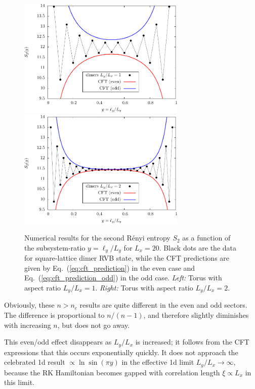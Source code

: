 \documentclass[11pt]{iopart}
\begin{document}
\begin{figure}[t]
\begin{center}
 \includegraphics[width=8cm]{./figures/dimers_shape.pdf}
 \includegraphics[width=8cm]{./figures/dimers_shape2.pdf}
 \end{center}
 \caption{Numerical results for the second R\'enyi entropy $S_2$ as a function of the subsystem-ratio $y=\ell_y/L_y$ for $L_x=20$. Black dots are the data for square-lattice dimer RVB state, while the CFT predictions are given by Eq.~(\ref{eq:cft_prediction}) in the even case and Eq.~(\ref{eq:cft_prediction_odd}) in the odd case. \emph{Left:} Torus with aspect ratio $L_y/L_x=1$. \emph{Right:} Torus with aspect ratio $L_y/L_x=2$.}
 \label{fig:dimers_shape}
\end{figure}
Obviously, these $n>n_c$ results are quite different in the even and odd sectors. The difference is proportional to $n/(n-1)$, and therefore slightly diminishes with increasing $n$, but does not go away. 


This even/odd effect disappears as $L_y/L_x$ is increased; it follows from the CFT expressions that this occurs exponentially quickly.  It does not approach the celebrated 1d result\cite{Cardy} $\propto \ln\sin (\pi y)$ in the effective 1d limit $L_y/L_x\to\infty$, because the RK Hamiltonian becomes gapped with correlation length $\xi\propto L_x$ in this limit. 
\end{document}
